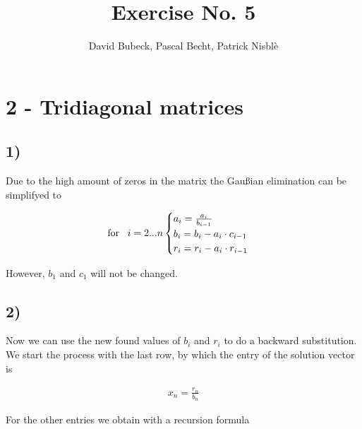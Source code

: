\documentclass[11pt, a4paper, reqno]{scrartcl}
\begin{document}
    \title{Exercise No. 5}
    \author{David Bubeck, Pascal Becht, Patrick Nisbl\`e}
    \maketitle
    

    \newpage
    \section*{2 - Tridiagonal matrices}

    	\subsection*{1)}
			Due to the high amount of zeros in the matrix the Gaußian elimination 				can be simplifyed to
			
			\begin{align}
				\mbox{for \, $i = 2 ... n$}
				\begin{cases}
					a_i = \frac{a_i}{b_{i-1}} \\
					b_i = b_i - a_i \cdot c_{i-1} \\
					r_i = r_i - a_i \cdot r_{i-1}
				\end{cases}
			\end{align}
			
			However, $b_1$ and $c_1$ will not be changed.
    		

		\subsection*{2)}
			Now we can use the new found values of $b_i$ and $r_i$ to do a backward 			substitution. We start the process with the last row, by which the 					entry of the solution vector is 
			
			\begin{align}
				x_n = \frac{r_n}{b_n}
			\end{align}
						
			For the other entries we obtain with a recursion formula
			
\end{document}
